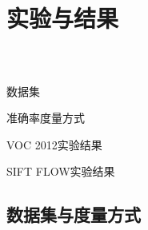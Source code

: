 \section{实验与结果}
\frame
{
  \frametitle{\secname~ }
  \begin{block}{数据集}
  \end{block}
  \begin{block}{准确率度量方式}
  \end{block}
  \begin{block}{VOC 2012实验结果}
  \end{block}
  \begin{block}{SIFT FLOW实验结果}
  \end{block}
}
\subsection*{数据集与度量方式}
